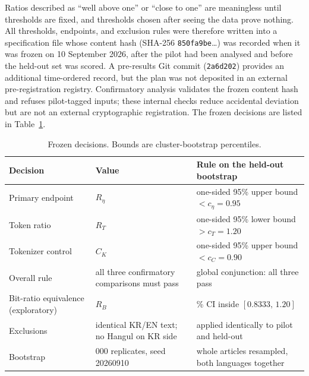 \documentclass[11pt,a4paper]{article}
\newcommand{\RT}{R_{T}}
\newcommand{\RB}{R_{B}}
\newcommand{\Reta}{R_{\eta}}
\newcommand{\CK}{C_{K}}
\begin{document}
Ratios described as ``well above one'' or ``close to one'' are meaningless
until thresholds are fixed, and thresholds chosen after seeing the data
prove nothing. All thresholds, endpoints, and exclusion rules were therefore
written into a specification file whose content hash (SHA-256
\texttt{850fa9be}\ldots) was recorded when it was frozen on 10 September
2026, after the pilot had been analysed and before the held-out set was
scored. A pre-results Git commit (\texttt{2a6d202}) provides an additional
time-ordered record, but the plan was not deposited in an external
pre-registration registry. Confirmatory analysis validates the frozen content
hash and refuses pilot-tagged inputs; these internal checks reduce accidental
deviation but are not an external cryptographic registration. The frozen
decisions are listed in Table~\ref{tab:spec}.

\begin{table}[htbp]
\centering\small
\caption{Frozen decisions. Bounds are cluster-bootstrap percentiles.}
\label{tab:spec}
\begin{tabularx}{\textwidth}{@{}l>{\raggedright\arraybackslash}p{5.2cm}>{\raggedright\arraybackslash}X@{}}
\toprule
Decision & Value & Rule on the held-out bootstrap \\
\midrule
Primary endpoint & $\Reta$ & one-sided 95\% upper bound $<c_\eta=0.95$ \\
Token ratio & $\RT$ & one-sided 95\% lower bound $>c_T=1.20$ \\
Tokenizer control & $\CK$ & one-sided 95\% upper bound $<c_C=0.90$ \\
Overall rule & all three confirmatory comparisons must pass & global conjunction: all three pass \\
Bit-ratio equivalence (exploratory) & $\RB$ & 90\% CI inside $[0.8333,\,1.20]$ \\
Exclusions & identical KR/EN text; no Hangul on KR side & applied identically to pilot and held-out \\
Bootstrap & 10{,}000 replicates, seed 20260910 & whole articles resampled, both languages together \\
\bottomrule
\end{tabularx}
\end{table}
\end{document}

